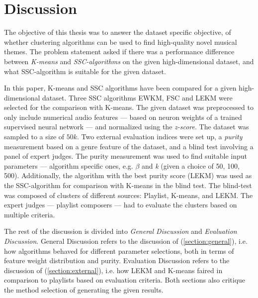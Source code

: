 \documentclass[../report.tex]{subfiles}
\begin{document}
\chapter{Discussion}
The objective of this thesis was to answer the dataset specific objective, of whether clustering algorithms can be used to find high-quality novel musical themes. The problem statement asked if there was a performance difference between \textit{K-means} and \textit{SSC-algorithms} on the given high-dimensional dataset, and what SSC-algorithm is suitable for the given dataset.

In this paper, K-means and SSC algorithms have been compared for a given high-dimensional dataset. Three SSC algorithms EWKM, FSC and LEKM
were selected for the comparison with K-means. The given dataset was preprocessed to only include numerical audio features  --- based on neuron weights of a trained supervised neural network --- and normalized using the \textit{z-score}. The dataset was sampled to a size of $50k$. Two external evaluation indices were set up, a \textit{purity} measurement based on a genre feature of the dataset, and a blind test involving a panel of expert judges. The purity measurement was used to find suitable input parameters --- algorithm specific ones, e.g. $\beta$ and \textit{k} (given a choice of 50, 100, 500). Additionally, the algorithm with the best purity score (LEKM) was used as the SSC-algorithm for comparison with K-means in the blind test. The blind-test was composed of clusters of different sources: Playlist, K-means, and LEKM. The expert judges --- playlist composers --- had to evaluate the clusters based on multiple criteria.


The rest of the discussion is divided into \textit{General Discussion} and \textit{Evaluation Discussion}. General Discussion refers to the discussion of  (\cref{section:general}), i.e. how algorithms behaved for different parameter selections, both in terms of feature weight distribution and purity. Evaluation Discussion refers to the discussion of  (\cref{section:external}), i.e. how LEKM and K-means faired in comparison to playlists based on evaluation criteria. Both sections also critique the method selection of generating the given results.
\end{document}

